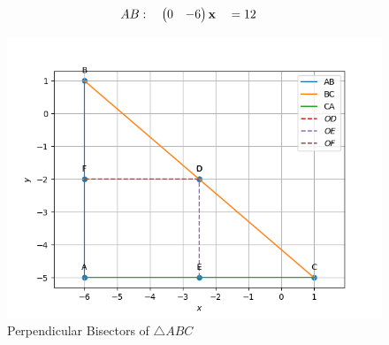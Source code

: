\documentclass[11pt]{book}
\begin{document}
\begin{enumerate}[label=\thesection.\arabic*.,ref=\thesection.\theenumi]
\begin{alignat}{2}
			AB&: \quad \begin{pmatrix}0 & -6\end{pmatrix}\mathbf{x} &&= 12
		\end{alignat}
		\begin{figure}[H]
\includegraphics[width=\columnwidth]{figs/Perpendicular bisector.png}
\caption{Perpendicular Bisectors of $\triangle ABC$}
\label{fig:Perpendicular bisectors }
\end{figure}


\end{enumerate}
\end{document}

